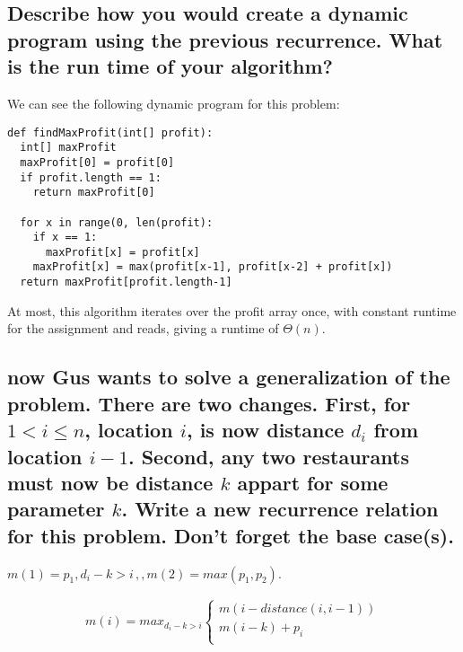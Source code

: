 \documentclass[titlepage]{article}\usepackage[]{graphicx}\usepackage[]{color}
\begin{document}
\subsection{Describe how you would create a dynamic program using the previous
recurrence. What is the run time of your algorithm?} 

We can see the following dynamic program for this problem:
\begin{lstlisting}
def findMaxProfit(int[] profit):
  int[] maxProfit
  maxProfit[0] = profit[0]
  if profit.length == 1:
	return maxProfit[0]

  for x in range(0, len(profit):
	if x == 1:
	  maxProfit[x] = profit[x]
	maxProfit[x] = max(profit[x-1], profit[x-2] + profit[x])
  return maxProfit[profit.length-1]
\end{lstlisting}

At most, this algorithm iterates over the profit array once, with constant
runtime for the assignment and reads, giving a runtime of $\Theta(n)$.

\subsection{now Gus wants to solve a generalization of the problem. There are
  two changes. First, for $1 < i \leq n$, location $i$, is now distance $d_i$
  from location $i-1$. Second, any two restaurants must now be distance $k$
  appart for some parameter $k$. Write a new recurrence relation for this
problem. Don't forget the base case(s).}

$ m(1) = p_1 , d_i - k > i\,,, m(2) = max(p_1, p_2)$. 

\begin{align*}
	m(i) = max_{d_i -k > i} \begin{cases} 
		  m(i-distance(i, i-1))  \\
		  m(i-k) + p_i\\
\end{cases}
\end{align*}
\end{document}
